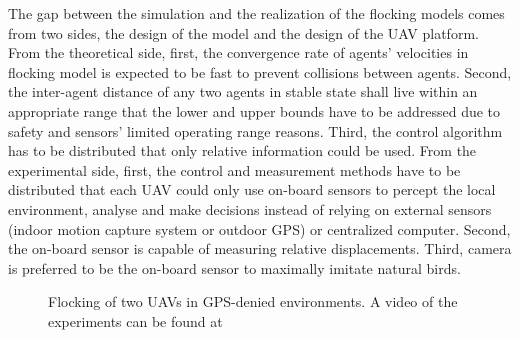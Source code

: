 The gap between the simulation and the realization of the flocking models comes from two sides, the design of the model and the design of the UAV platform. From the theoretical side, first, the convergence rate of agents' velocities in flocking model is expected to be fast to prevent collisions between agents. Second, the inter-agent distance of any two agents in stable state shall live within an appropriate range that the lower and upper bounds have to be addressed due to safety and sensors' limited operating range reasons. Third, the control algorithm has to be distributed that only relative information could be used. From the experimental side, first, the control and measurement methods have to be distributed that each UAV could only use on-board sensors to percept the local environment, analyse and make decisions instead of relying on external sensors (indoor motion capture system or outdoor GPS) or centralized computer. Second, the on-board sensor is capable of measuring relative displacements. Third, camera is preferred to be the on-board sensor to maximally imitate natural birds.

\begin{figure}[htb]
  \centering
  \caption{Flocking of two UAVs in GPS-denied environments. A video of the experiments can be found at }\label{fig:indoor_outdoor}
\end{figure}


